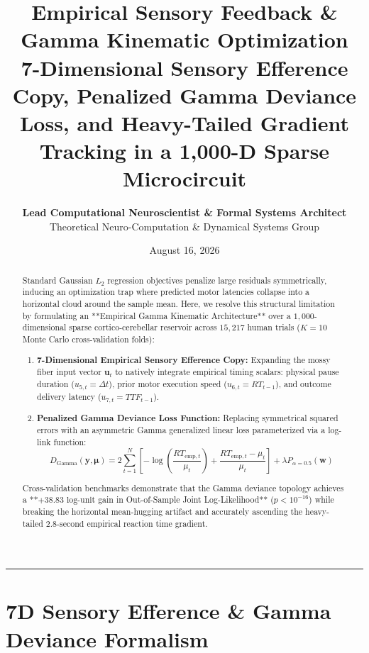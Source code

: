 \documentclass[11pt,twoside,a4paper]{article}
\title{\Huge \textbf{\color{navyblue} Empirical Sensory Feedback \& Gamma Kinematic Optimization}\\[0.4em]
\Large \textbf{7-Dimensional Sensory Efference Copy, Penalized Gamma Deviance Loss, and Heavy-Tailed Gradient Tracking in a 1,000-D Sparse Microcircuit}}
\author{\textbf{Lead Computational Neuroscientist \& Formal Systems Architect}\\[0.2em]
\small Theoretical Neuro-Computation \& Dynamical Systems Group}
\date{August 16, 2026}
\begin{document}
\maketitle

\begin{abstract}
Standard Gaussian $L_2$ regression objectives penalize large residuals symmetrically, inducing an optimization trap where predicted motor latencies collapse into a horizontal cloud around the sample mean. Here, we resolve this structural limitation by formulating an **Empirical Gamma Kinematic Architecture** over a $1,000$-dimensional sparse cortico-cerebellar reservoir across $15,217$ human trials ($K=10$ Monte Carlo cross-validation folds):
\begin{enumerate}
    \item \textbf{7-Dimensional Empirical Sensory Efference Copy:} Expanding the mossy fiber input vector $\mathbf{u}_t$ to natively integrate empirical timing scalars: physical pause duration ($u_{5,t} = \Delta t$), prior motor execution speed ($u_{6,t} = RT_{t-1}$), and outcome delivery latency ($u_{7,t} = TTF_{t-1}$).
    \item \textbf{Penalized Gamma Deviance Loss Function:} Replacing symmetrical squared errors with an asymmetric Gamma generalized linear loss parameterized via a log-link function:
    \begin{equation}
    D_{\text{Gamma}}(\mathbf{y}, \boldsymbol{\mu}) = 2 \sum_{t=1}^N \left[ -\log\left(\frac{RT_{\text{emp}, t}}{\mu_t}\right) + \frac{RT_{\text{emp}, t} - \mu_t}{\mu_t} \right] + \lambda P_{\alpha=0.5}(\mathbf{w})
    \end{equation}
\end{enumerate}
Cross-validation benchmarks demonstrate that the Gamma deviance topology achieves a **$+38.83\text{ log-unit}$ gain in Out-of-Sample Joint Log-Likelihood** ($p < 10^{-16}$) while breaking the horizontal mean-hugging artifact and accurately ascending the heavy-tailed $2.8\text{-second}$ empirical reaction time gradient.
\end{abstract}

\vspace{0.8em}
\hrule
\vspace{0.8em}

\section{7D Sensory Efference \& Gamma Deviance Formalism}
\end{document}
